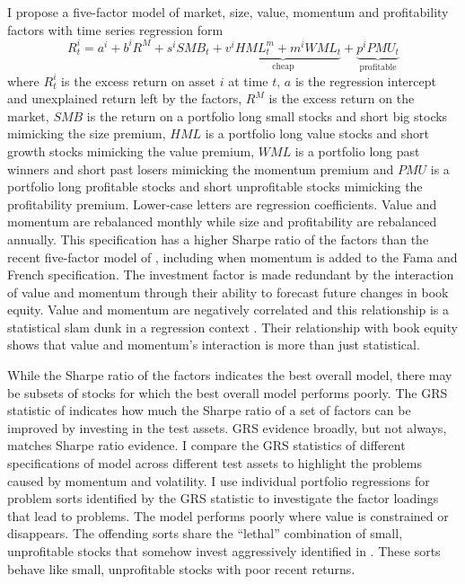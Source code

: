 I propose a five-factor model of market, size, value, momentum and
profitability factors with time series regression form
\begin{equation} \label{eq:B16}
R_t^i = a^i+b^iR^M+s^iSMB_t+
\underbrace{v^iHML_t^m+m^iWML_t}_\text{cheap}+
\underbrace{p^iPMU_t}_\text{profitable}
\end{equation}
where $R_t^i$ is the excess return on asset $i$ at time $t$, $a$ is the
regression intercept and unexplained return left by the factors, $R^M$ is the
excess return on the market, $SMB$ is the return on a portfolio long small
stocks and short big stocks mimicking the size premium, $HML$ is a portfolio
long value stocks and short growth stocks mimicking the value premium, $WML$ is
a portfolio long past winners and short past losers mimicking the momentum
premium and $PMU$ is a portfolio long profitable stocks and short unprofitable
stocks mimicking the profitability premium.
Lower-case letters are regression coefficients.
Value and momentum are rebalanced monthly while size and profitability are
rebalanced annually.
This specification has a higher Sharpe ratio of the factors than the recent
five-factor model of \textcite{fama2015five}, including when momentum is added
to the Fama and French specification.
The investment factor is made redundant by the interaction of value and
momentum through their ability to forecast future changes in book equity.
Value and momentum are negatively correlated and this relationship is a
statistical slam dunk in a regression context
\parencite{asness1997interaction, fama2015incremental}.
Their relationship with book equity shows that value and momentum's interaction
is more than just statistical.

While the Sharpe ratio of the factors indicates the best overall model, there
may be subsets of stocks for which the best overall model performs poorly.
The GRS statistic of \textcite{gibbons1989test} indicates how much the Sharpe
ratio of a set of factors can be improved by investing in the test assets.
GRS evidence broadly, but not always, matches Sharpe ratio evidence.
I compare the GRS statistics of different specifications of model across
different test assets to highlight the problems caused by momentum and
volatility.
I use individual portfolio regressions for problem sorts identified by the GRS
statistic to investigate the factor loadings that lead to problems.
The model performs poorly where value is constrained or disappears.
The offending sorts share the ``lethal” combination of small, unprofitable
stocks that somehow invest aggressively identified in
\textcite{fama2015five, fama2016dissecting}.
These sorts behave like small, unprofitable stocks with poor recent returns.


